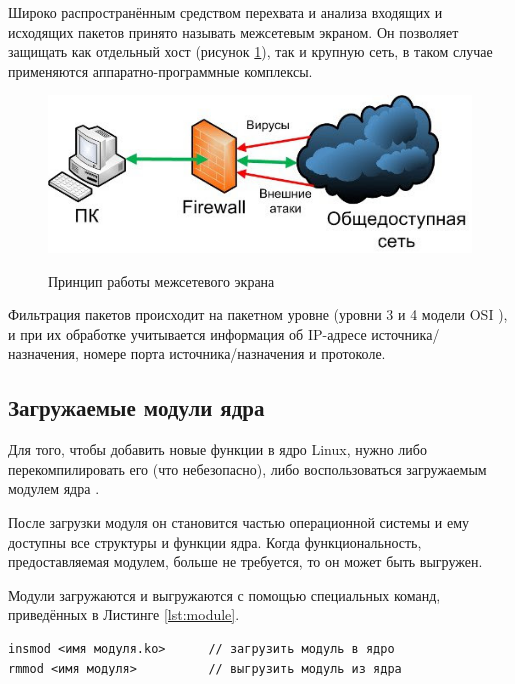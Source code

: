 \newpage

Широко распространённым средством перехвата и анализа входящих и исходящих пакетов принято называть межсетевым экраном. Он позволяет защищать как отдельный хост (рисунок \ref{fig1:image}), так и крупную сеть, в таком случае применяются аппаратно-программные комплексы. 

\begin{figure}[h]
	\centering
	\begin{center}
		{\includegraphics[scale=0.5]{img/firewall.jpg}}
		\caption{Принцип работы межсетевого экрана}
		\label{fig1:image}
	\end{center}
\end{figure}

Фильтрация пакетов происходит на пакетном уровне (уровни 3 и 4 модели OSI \cite{fw}), и при их обработке учитывается информация об IP-адресе источника/ назначения, номере порта источника/назначения и протоколе. \newline

\subsection{Загружаемые модули ядра}
Для того, чтобы добавить новые функции в ядро Linux, нужно либо перекомпилировать его (что небезопасно), либо воспользоваться загружаемым модулем ядра \cite{os}. 

После загрузки модуля он становится частью операционной системы и ему доступны все структуры и функции ядра. Когда функциональность, предоставляемая модулем, больше не требуется, то он может быть выгружен.

Модули загружаются и выгружаются с помощью специальных команд, приведённых в Листинге \ref{lst:module}.

\begin{lstlisting}[caption = {Команды для загрузки и выгрузки загружаемого модуля ядра}, label=lst:module]
insmod <имя модуля.ko>		// загрузить модуль в ядро
rmmod <имя модуля>			// выгрузить модуль из ядра
\end{lstlisting}

